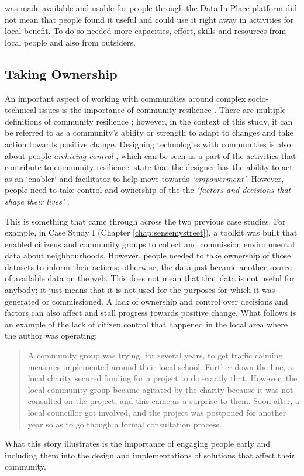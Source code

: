 was made available and usable for people through the Data:In Place platform did not mean that people found it useful and could use it right away in activities for local benefit. To do so needed more capacities, effort, skills and resources from local people and also from outsiders.

\subsection{Taking Ownership}
An important aspect of working with communities around complex socio-technical issues is the importance of community resilience \citep{mark_resilience_2008,aldrich_social_2015,bernarda_design_2017,ferreira_social_2020}. There are multiple definitions of community resilience \citep{mark_resilience_2008,aldrich_social_2015}; however, in the context of this study, it can be referred to as a community's ability or strength to adapt to changes and take action towards positive change. Designing technologies with communities is also about people \textit{archiving control} \citep{vines_configuring_2013}, which can be seen as a part of the activities that contribute to community resilience. \citet{bernarda_design_2017} state that the designer has the ability to act as an `enabler` and facilitator to help move towards \textit{`empowerment'}. However, people need to take control and ownership of the the \textit{`factors and decisions that shape their lives'} \citep[p. 903]{bernarda_design_2017}.

This is something that came through across the two previous case studies. For example, in Case Study I (Chapter \ref{chap:sensemystreet}), a toolkit was built that enabled citizens and community groups to collect and commission environmental data about neighbourhoods. However, people needed to take ownership of those datasets to inform their actions; otherwise, the data just became another source of available data on the web. This does not mean that that data is not useful for anybody; it just means that it is not used for the purposes for which it was generated or commissioned. A lack of ownership and control over decisions and factors can also affect and stall progress towards positive change. What follows is an example of the lack of citizen control that happened in the local area where the author was operating:
\begin{quote}
    A community group was trying, for several years, to get traffic calming measures implemented around their local school. Further down the line, a local charity secured funding for a project to do exactly that. However, the local community group became agitated by the charity because it was not consulted on the project, and this came as a surprise to them. Soon after, a local councillor got involved, and the project was postponed for another year so as to go though a formal consultation process.
\end{quote}
What this story illustrates is the importance of engaging people early and including them into the design and implementations of solutions that affect their community.

